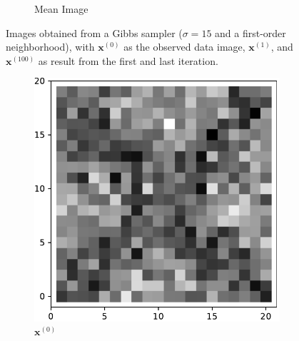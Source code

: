 \begin{figure}[!h]
\begin{subfigure}[b]{0.24\textwidth}
            \caption[]%
            {{\small Mean Image}}    
            \label{fig:15d1mean}
        \end{subfigure}
        \caption[]
        {\small Images obtained from a Gibbs sampler ($\sigma=15$ and a first-order neighborhood), with $\mathbf{x}^{(0)}$ as the observed data image, $\mathbf{x}^{(1)}$, and $\mathbf{x}^{(100)}$ as result from the first and last iteration. }
        \label{fig:15d1}
    \end{figure}
   \begin{figure}[!h]
        \centering
        \begin{subfigure}[b]{0.24\textwidth}
            \centering
            \includegraphics[width=\textwidth]{./img/ximage.pdf}
            \caption[]%
            {{\small $\mathbf{x}^{(0)}$}}    
            \label{fig:ximage5}
        \end{subfigure}
        \begin{subfigure}[b]{0.24\textwidth}  
            \centering 

\end{subfigure}
\end{figure}
